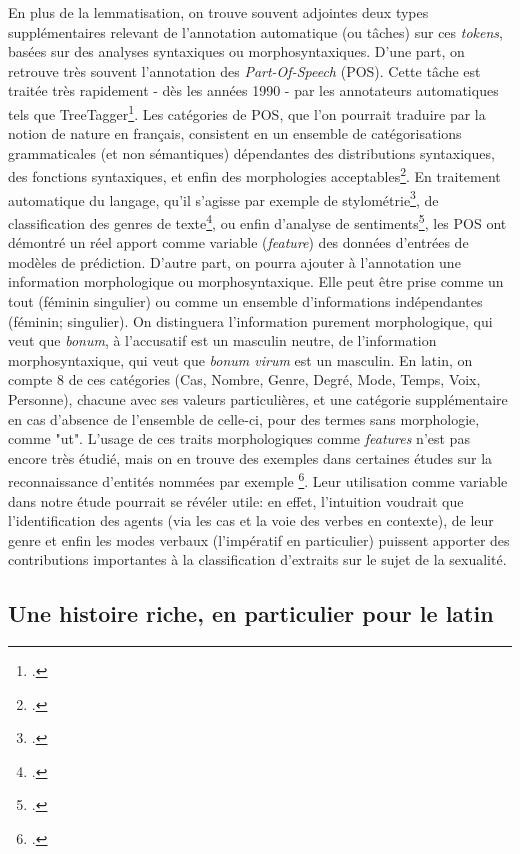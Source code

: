 En plus de la lemmatisation, on trouve souvent adjointes deux types supplémentaires  relevant de l'annotation automatique (ou tâches) sur ces \textit{tokens}, basées sur des analyses syntaxiques ou morphosyntaxiques. D'une part, on retrouve très souvent l'annotation des \textit{Part-Of-Speech} (POS). Cette tâche est traitée très rapidement - dès les années 1990 - par les annotateurs automatiques tels que TreeTagger\footcite{schmid1994treetagger}. Les catégories de POS, que l'on pourrait traduire par la notion de nature en français, consistent en un ensemble de catégorisations grammaticales (et non sémantiques) dépendantes des distributions syntaxiques, des fonctions syntaxiques, et enfin des morphologies acceptables\footcite{schachter1985parts}. En traitement automatique du langage, qu'il s'agisse par exemple de stylométrie\footcite{Cafieroeaax5489}, de classification des genres de texte\footcite{feldman2009part}, ou enfin d'analyse de sentiments\footcite{wang2015pos}, les POS ont démontré un réel apport comme variable (\textit{feature}) des données d'entrées de modèles de prédiction. D'autre part, on pourra ajouter à l'annotation une information morphologique ou morphosyntaxique. Elle peut être prise comme un tout (féminin singulier) ou comme un ensemble d'informations indépendantes (féminin; singulier). On distinguera l'information purement morphologique, qui veut que \textit{bonum}, à l'accusatif est un masculin neutre, de l'information morphosyntaxique, qui veut que \textit{bonum virum} est un masculin. En latin, on compte 8 de ces catégories (Cas, Nombre, Genre, Degré, Mode, Temps, Voix, Personne), chacune avec ses valeurs particulières, et une catégorie supplémentaire en cas d'absence de l'ensemble de celle-ci, pour des termes sans morphologie, comme "ut". L'usage de ces traits morphologiques comme \textit{features} n'est pas encore très étudié, %
mais on en trouve des exemples dans certaines études sur la reconnaissance d'entités nommées par exemple \footcite[Par exemple]{zirikly2014named}. Leur utilisation comme variable dans notre étude pourrait se révéler utile: en effet, l'intuition voudrait que l'identification des agents (via les cas et la voie des verbes en contexte), de leur genre et enfin les modes verbaux (l'impératif en particulier) puissent apporter des contributions importantes à la classification d'extraits sur le sujet de la sexualité.


\subsection{Une histoire riche, en particulier pour le latin}


